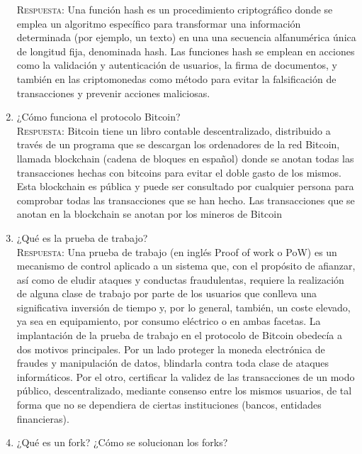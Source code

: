 \documentclass[letterpaper,10pt]{article}
\begin{document}
\begin{enumerate}
    \textsc{Respuesta:}
    Una función hash es un procedimiento criptográfico donde se emplea un algoritmo específico para transformar una información determinada (por ejemplo, un texto) en una una secuencia alfanumérica única de longitud fija, denominada hash.
Las funciones hash se emplean en acciones como la validación y autenticación de usuarios, la firma de documentos, y también en las criptomonedas como método para evitar la falsificación de transacciones y prevenir acciones maliciosas.
    \\
    \item ¿Cómo funciona el protocolo Bitcoin? \\

    \textsc{Respuesta:}
    Bitcoin tiene un libro contable descentralizado, distribuido a través de un programa que se descargan los ordenadores de la red Bitcoin, llamada blockchain (cadena de bloques en español) donde se anotan todas las transacciones hechas con bitcoins para evitar el doble gasto de los mismos. Esta blockchain es pública y puede ser consultado por cualquier persona para comprobar todas las transacciones que se han hecho. Las transacciones que se anotan en la blockchain se anotan por los mineros de Bitcoin
    \\
    
    \item ¿Qué es la prueba de trabajo?\\

    \textsc{Respuesta:}
    Una prueba de trabajo (en inglés Proof of work o PoW) es un mecanismo de control aplicado a un sistema que, con el propósito de afianzar, así como de eludir ataques y conductas fraudulentas, requiere la realización de alguna clase de trabajo por parte de los usuarios que conlleva una significativa inversión de tiempo y, por lo general, también, un coste elevado, ya sea en equipamiento, por consumo eléctrico o en ambas facetas.
La implantación de la prueba de trabajo en el protocolo de Bitcoin obedecía a dos motivos principales. Por un lado proteger la moneda electrónica de fraudes y manipulación de datos, blindarla contra toda clase de ataques informáticos. Por el otro, certificar la validez de las transacciones de un modo público, descentralizado, mediante consenso entre los mismos usuarios, de tal forma que no se dependiera de ciertas instituciones (bancos, entidades financieras).
    \\
    
    \item ¿Qué es un fork? ¿Cómo se solucionan los forks? \\


\end{enumerate}
\end{document}
